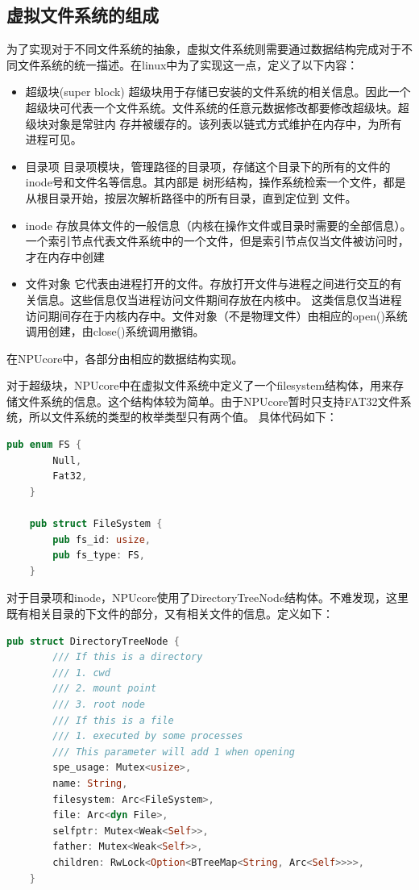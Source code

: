 \subsection{虚拟文件系统的组成}

为了实现对于不同文件系统的抽象，虚拟文件系统则需要通过数据结构完成对于不同文件系统的统一描述。在linux中为了实现这一点，定义了以下内容：

\begin{itemize}
	\item {超级块(super block)}
	超级块用于存储已安装的文件系统的相关信息。因此一个超级块可代表一个文件系统。文件系统的任意元数据修改都要修改超级块。超级块对象是常驻内
	存并被缓存的。该列表以链式方式维护在内存中，为所有进程可见。
	\item {目录项}
	目录项模块，管理路径的目录项，存储这个目录下的所有的文件的inode号和文件名等信息。其内部是
	树形结构，操作系统检索一个文件，都是从根目录开始，按层次解析路径中的所有目录，直到定位到
	文件。
	\item {inode}
	存放具体文件的一般信息（内核在操作文件或目录时需要的全部信息）。一个索引节点代表文件系统中的一个文件，但是索引节点仅当文件被访问时，才在内存中创建
	\item {文件对象}
	它代表由进程打开的文件。存放打开文件与进程之间进行交互的有关信息。这些信息仅当进程访问文件期间存放在内核中。
	这类信息仅当进程访问期间存在于内核内存中。文件对象（不是物理文件）由相应的open()系统调用创建，由close()系统调用撤销。
\end{itemize}

在NPUcore中，各部分由相应的数据结构实现。

对于超级块，NPUcore中在虚拟文件系统中定义了一个filesystem结构体，用来存储文件系统的信息。这个结构体较为简单。由于NPUcore暂时只支持FAT32文件系统，所以文件系统的类型的枚举类型只有两个值。
具体代码如下：

\begin{lstlisting}[language={Rust},caption={filesystem}]
	pub enum FS {
		Null,
		Fat32,
	}
	
	pub struct FileSystem {
		pub fs_id: usize,
		pub fs_type: FS,
	}
\end{lstlisting}

对于目录项和inode，NPUcore使用了DirectoryTreeNode结构体。不难发现，这里既有相关目录的下文件的部分，又有相关文件的信息。定义如下：

\begin{lstlisting}[language={Rust}, caption={DirectoryTreeNode}]
	pub struct DirectoryTreeNode {
		/// If this is a directory
		/// 1. cwd
		/// 2. mount point
		/// 3. root node
		/// If this is a file
		/// 1. executed by some processes
		/// This parameter will add 1 when opening
		spe_usage: Mutex<usize>,
		name: String,
		filesystem: Arc<FileSystem>,
		file: Arc<dyn File>,
		selfptr: Mutex<Weak<Self>>,
		father: Mutex<Weak<Self>>,
		children: RwLock<Option<BTreeMap<String, Arc<Self>>>>,
	}
\end{lstlisting}

